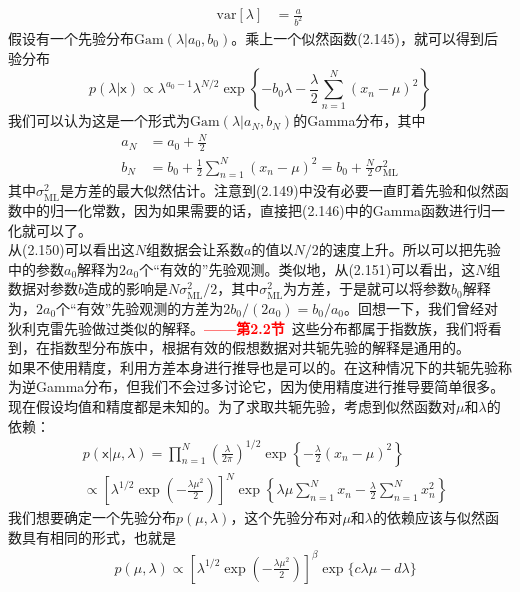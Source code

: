 \documentclass[b5paper]{book}
\numberwithin{equation}{chapter}
\newcommand {\sfx} {\boldsymbol{\mathsf{x}}}
\begin{document}
{\begin{align}
		\mathrm{var}[\lambda] &=\frac{a}{b^2}
	\end{align}
	\indent 假设有一个先验分布$\mathrm{Gam}(\lambda|a_0,b_0)$。乘上一个似然函数(2.145)，就可以得到后验分布
	\begin{equation}
		p(\lambda|\sfx)\propto\lambda^{a_0-1}\lambda^{N/2}\exp\left\{-b_0\lambda-\frac{\lambda}{2}\sum_{n=1}^N(x_n-\mu)^2\right\}
	\end{equation}
	我们可以认为这是一个形式为$\mathrm{Gam}(\lambda|a_N,b_N)$的Gamma分布，其中
	\begin{align}
		a_N&=a_0+\frac{N}{2} \\
		b_N&=b_0+\frac{1}{2}\sum_{n=1}^N(x_n-\mu)^2=b_0+\frac{N}{2}\sigma_{\mathrm{ML}}^2
	\end{align}
	其中$\sigma_{\mathrm{ML}}^2$是方差的最大似然估计。注意到(2.149)中没有必要一直盯着先验和似然函数中的归一化常数，因为如果需要的话，直接把(2.146)中的Gamma函数进行归一化就可以了。\\
	\indent 从(2.150)可以看出这$N$组数据会让系数$a$的值以$N/2$的速度上升。所以可以把先验中的参数$a_0$解释为$2a_0$个“有效的”先验观测。类似地，从(2.151)可以看出，这$N$组数据对参数$b$造成的影响是$N\sigma_{\mathrm{ML}}^2/2$，其中$\sigma_{\mathrm{ML}}^2$为方差，于是就可以将参数$b_0$解释为，$2a_0$个“有效”先验观测的方差为$2b_0/(2a_0)=b_0/a_0$。回想一下，我们曾经对狄利克雷先验做过类似的解释。\textcolor{red}{\textbf{——第2.2节}}\ 这些分布都属于指数族，我们将看到，在指数型分布族中，根据有效的假想数据对共轭先验的解释是通用的。\\
	\indent 如果不使用精度，利用方差本身进行推导也是可以的。在这种情况下的共轭先验称为逆Gamma分布，但我们不会过多讨论它，因为使用精度进行推导要简单很多。\\
	\indent 现在假设均值和精度都是未知的。为了求取共轭先验，考虑到似然函数对$\mu$和$\lambda$的依赖：
	\begin{equation}
	\begin{split}
		&p(\sfx|\mu,\lambda)=\prod_{n=1}^{N}(\frac{\lambda}{2\pi})^{1/2}\exp\left\{-\frac{\lambda}{2}(x_n-\mu)^2\right\} \\
		&\propto \left[\lambda^{1/2}\exp(-\frac{\lambda\mu^2}{2})\right]^N \exp\left\{\lambda\mu\sum_{n=1}^Nx_n - \frac{\lambda}{2}\sum_{n=1}^Nx_n^2\right\}
	\end{split}
	\end{equation}
	我们想要确定一个先验分布$p(\mu,\lambda)$，这个先验分布对$\mu$和$\lambda$的依赖应该与似然函数具有相同的形式，也就是
	\begin{equation}
	\begin{split}
		&p(\mu,\lambda) \propto \left[\lambda^{1/2}\exp(-\frac{\lambda\mu^2}{2})\right]^\beta \exp\{c\lambda\mu-d\lambda\}\\

\end{split}
\end{equation}}
\end{document}
